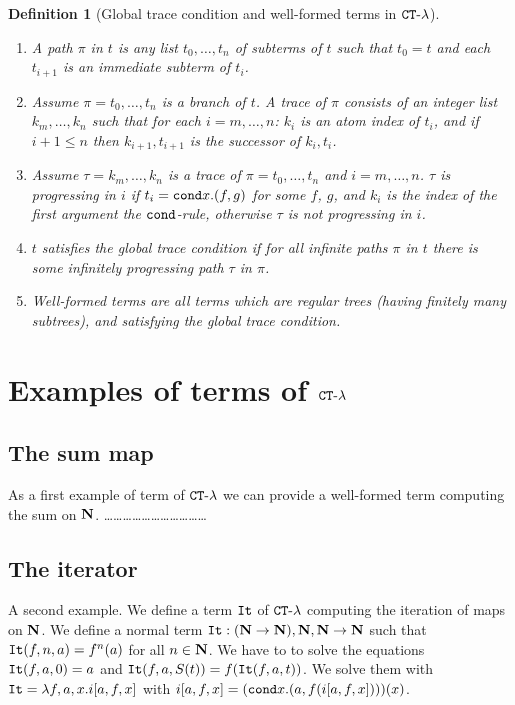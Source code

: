 \documentclass{article}
\newtheorem{definition}[theorem]{Definition}
\begin{document}
\begin{definition}[Global trace condition and well-formed terms in  ${ {\tt CT} \mbox{-} \lambda}$]
\begin{enumerate}
\item
A path $\pi$ in $t$ is any list $t_0, \ldots, t_n$ of subterms of $t$ 
such that $t_0 = t$ and each $t_{i+1}$ is an immediate subterm of $t_i$. 

\item
Assume $\pi =t_0, \ldots, t_n$ is a branch of $t$. A trace of $\pi$ consists of an integer list 
$k_m, \ldots, k_n$ such that for each $i=m,\ldots, n$:
$k_i$ is an atom index of $t_i$, and if $i+1 \le n$ then $k_{i+1},t_{i+1}$ is the successor of $k_i, t_i$.

\item
Assume $\tau = k_m, \ldots, k_n$ is a trace of $\pi =t_0, \ldots, t_n$ and $i=m,\ldots, n$.
$\tau$ is progressing in $i$ if $t_i={\tt cond} x.(f,g)$ for some $f$, $g$,
and $k_i$ is the index of the first argument the ${\tt cond}$-rule, otherwise $\tau$ is not progressing in $i$.

\item
$t$ satisfies the global trace condition if for all infinite paths $\pi$ in $t$ 
there is some infinitely progressing path $\tau$ in $\pi$.

\item
Well-formed terms are all terms which are regular trees (having finitely many subtrees), 
and satisfying the global trace condition.

\end{enumerate}
\end{definition}


\section{Examples of terms of ${ {\tt CT} \mbox{-} \lambda}$}

\subsection{The sum map}
As a first example of term of  ${ {\tt CT} \mbox{-} \lambda}$ we can provide a well-formed term computing the sum on ${\bf N}$.
\ldots\ldots\ldots\ldots\ldots\ldots\ldots\ldots\ldots\ldots\ldots


\subsection{The iterator}
A second example. We define a term ${\tt It}$ of  ${ {\tt CT} \mbox{-} \lambda}$ computing the iteration of maps on ${\bf N}$.
We define a normal term ${\tt It}:({\bf N} \rightarrow {\bf N}), {\bf N},{\bf N} \rightarrow {\bf N}$ such that
${\tt It}(f,n,a)=f^n(a)$ for all $n \in {\bf N}$. 
We have to to solve the equations ${\tt It}(f,a,0) = a$ and ${\tt It}(f,a,S(t)) = f({\tt It}(f,a,t))$.
We solve them with ${\tt It} = \lambda f, a,x. i[a,f,x]$
with $ i[a,f,x] = ({\tt cond} x. (a, f( i[a,f,x]) ))(x)$.
\end{document}
